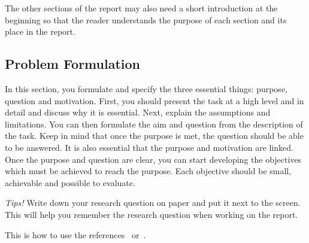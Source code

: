 The other sections of the report may also need a short introduction at the beginning so that the reader understands the purpose of each section and its place in the report.


\subsection{Problem Formulation} 

In this section, you formulate and specify the three essential things: purpose, question and motivation. First, you should present the task at a high level and in detail and discuss why it is essential. Next, explain the assumptions and limitations. You can then formulate the aim and question from the description of the task. Keep in mind that once the purpose is met, the question should be able to be answered. It is also essential that the purpose and motivation are linked. Once the purpose and question are clear, you can start developing the objectives which must be achieved to reach the purpose. Each objective should be small, achievable and possible to evaluate.  


\emph{Tips!} Write down your research question on paper and put it next to the screen. This will help you remember the research question when working on the report.

This is how to use the references~\cite{Berndtsson607210, Blomkvist2014} or~\citet{Turing1950}.